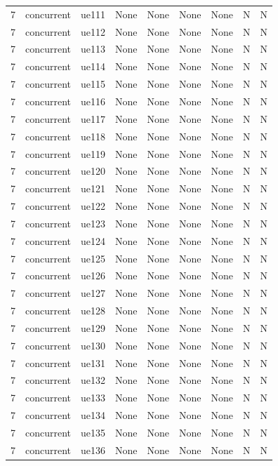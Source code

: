 \begin{table}[ht]
\begin{tabular}{|c|c|c|c|c|c|c|c|c|}
7 & concurrent & ue111 & None & None & None & None & N & N \\
7 & concurrent & ue112 & None & None & None & None & N & N \\
7 & concurrent & ue113 & None & None & None & None & N & N \\
7 & concurrent & ue114 & None & None & None & None & N & N \\
7 & concurrent & ue115 & None & None & None & None & N & N \\
7 & concurrent & ue116 & None & None & None & None & N & N \\
7 & concurrent & ue117 & None & None & None & None & N & N \\
7 & concurrent & ue118 & None & None & None & None & N & N \\
7 & concurrent & ue119 & None & None & None & None & N & N \\
7 & concurrent & ue120 & None & None & None & None & N & N \\
7 & concurrent & ue121 & None & None & None & None & N & N \\
7 & concurrent & ue122 & None & None & None & None & N & N \\
7 & concurrent & ue123 & None & None & None & None & N & N \\
7 & concurrent & ue124 & None & None & None & None & N & N \\
7 & concurrent & ue125 & None & None & None & None & N & N \\
7 & concurrent & ue126 & None & None & None & None & N & N \\
7 & concurrent & ue127 & None & None & None & None & N & N \\
7 & concurrent & ue128 & None & None & None & None & N & N \\
7 & concurrent & ue129 & None & None & None & None & N & N \\
7 & concurrent & ue130 & None & None & None & None & N & N \\
7 & concurrent & ue131 & None & None & None & None & N & N \\
7 & concurrent & ue132 & None & None & None & None & N & N \\
7 & concurrent & ue133 & None & None & None & None & N & N \\
7 & concurrent & ue134 & None & None & None & None & N & N \\
7 & concurrent & ue135 & None & None & None & None & N & N \\
7 & concurrent & ue136 & None & None & None & None & N & N \\

\end{tabular}
\end{table}
